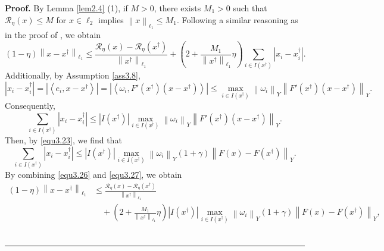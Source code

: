 \documentclass[a4paper,12pt]{article}
\numberwithin{equation}{section}
\newenvironment{proof}[1][Proof]{\textbf{#1.} }
{\ \rule{0.75em}{0.75em}\smallskip}
\begin{document}
\begin{proof}
    By Lemma \ref{lem2.4} (1), if $M>0$, there exists $M_{1}>0$ such that $\mathcal{R}_{\eta}\left(x\right)\leq M$ for $x\in\ell_{2}$ implies $\left\|x\right\|_{\ell_{1}}\leq M_{1}$. Following a similar reasoning as in the proof of \cite[Lemma 3.7]{LD25}, we obtain
    \begin{equation}\label{equ3.26}
        \left(1-\eta\right)\left\|x-x^{\dagger}\right\|_{\ell_{1}}\leq \frac{\mathcal{R}_{\eta}\left(x\right)-\mathcal{R}_{\eta}\left(x^{\dagger}\right)} {\left\|x^{\dagger}\right\|_{\ell_{1}}} +\left(2+\frac{M_{1}}{\left\|x^{\dagger}\right\|_{\ell_{1}}}\eta\right) \sum_{i\in I\left(x^{\dagger}\right)}\left|x_{i}-x_{i}^{\dagger}\right|.
    \end{equation} 
    Additionally, by Assumption \ref{ass3.8},
    \begin{equation*}
        \left|x_{i}-x^{\dagger}_{i}\right|=\left|\left<e_{i}, x-x^{\dagger}\right> \right| =\left|\left<\omega_{i}, F'\left(x^{\dagger}\right) \left(x-x^{\dagger}\right)\right>\right|\leq \max_{i\in I\left(x^{\dagger}\right)}\left\|\omega_{i}\right\|_{Y} \left\|F'\left(x^{\dagger}\right)\left(x-x^{\dagger}\right)\right\|_{Y}.
    \end{equation*}
    Consequently,
    \begin{equation*}
        \sum_{i\in I\left(x^{\dagger}\right)}\left|x_{i}-x_{i}^{\dagger}\right| \leq \left|I\left(x^{\dagger}\right)\right|\max_{i\in I\left(x^{\dagger}\right)} \left\|\omega_{i}\right\|_{Y} \left\|F'\left(x^{\dagger}\right)\left(x-x^{\dagger}\right)\right\|_{Y}.
    \end{equation*} 
    Then, by \eqref{equ3.23}, we find that
    \begin{equation}\label{equ3.27}
        \sum_{i\in I\left(x^{\dagger}\right)}\left|x_{i}-x_{i}^{\dagger}\right| \leq \left|I\left(x^{\dagger}\right)\right|\max_{i\in I\left(x^{\dagger}\right)} \left\|\omega_{i}\right\|_{Y} \left(1+\gamma\right)\left\|F\left(x\right)-F\left(x^{\dagger}\right)\right\|_{Y}.
    \end{equation}
    By combining \eqref{equ3.26} and \eqref{equ3.27}, we obtain
    \begin{align}\label{equ3.28}
        \left(1-\eta\right)\left\|x-x^{\dagger}\right\|_{\ell_{1}}
        & \leq \frac{\mathcal{R}_{\eta}\left(x\right)-\mathcal{R}_{\eta}\left(x^{\dagger}\right)} {\left\|x^{\dagger}\right\|_{\ell_{1}}} \nonumber\\
        & \quad +\left(2+\frac{M_{1}}{\left\|x^{\dagger}\right\|_{\ell_{1}}}\eta\right) \left|I\left(x^{\dagger}\right)\right|\max_{i\in I\left(x^{\dagger}\right)} \left\|\omega_{i}\right\|_{Y} \left(1+\gamma\right)\left\|F\left(x\right)-F\left(x^{\dagger}\right)\right\|_{Y},

\end{align}
\end{proof}
\end{document}
